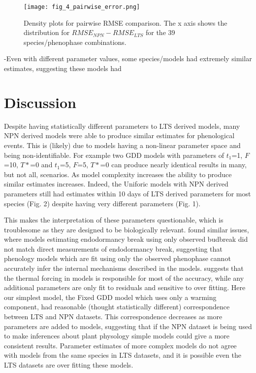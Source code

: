 \documentclass[fleqn,10pt,lineno]{wlpeerj} %
\begin{document}
\begin{figure}
	\centering
		\texttt{[image: fig\_4\_pairwise\_error.png]}
	\caption{Density plots for pairwise RMSE comparison. The x axis shows the distribution for $RMSE_{NPN} - RMSE_{LTS}$  for the  39 species/phenophase combinations.}
\end{figure}

-Even with different parameter values, some species/models had extremely similar
estimates, suggesting these models had 

\section*{Discussion}

Despite having statistically different parameters to LTS derived models, many NPN derived models were able to produce similar estimates for phenological events. This is (likely) due to models having a non-linear parameter space and being non-identifiable. For example two GDD models with parameters of $t_{1}$=1, $F$=10, $T*$=0 and $t_{1}$=5, $F$=5, $T*$=0 can produce nearly identical results in many, but not all, scenarios. As model complexity increases the ability to produce similar estimates increases. Indeed, the Uniforic models with NPN derived parameters still had estimates within 10 days of LTS derived parameters for most species (Fig. 2) despite having very different parameters (Fig. 1). 

This makes the interpretation of these parameters questionable, which is troublesome as they are designed to be biologically relevant. \cite{chuine2016} found similar issues, where models estimating endodormancy break using only observed budbreak did not match direct measurements of endodormancy break, suggesting that phenology models which are fit using only the observed phenophase cannot accurately infer the internal mechanisms described in the models. \cite{basler2016} suggests that the thermal forcing in models is responsible for most of the accuracy, while any additional parameters are only fit to residuals and sensitive to over fitting. Here our simplest model, the Fixed GDD model which uses only a warming component, had reasonable (thought statistically different) correspondence between LTS and NPN datasets. This correspondence decreases as more parameters are added to models, suggesting that if the NPN dataset is being used to make inferences about plant physology simple models could give a more consistent results. Parameter estimates of more complex models do not agree with models from the same species in LTS datasets, and it is possible even the LTS datasets are over fitting these models. 
\end{document}
